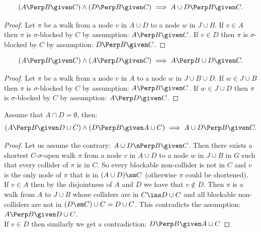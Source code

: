 \begin{Lem}
    \[ (A \Perp  B \given  C) \land (D \Perp  B \given C) \implies A \cup D \Perp  B \given C.\]
\begin{proof}
    Let $\pi$ be a walk from a node $v$ in $A \cup D$ to a node $w$ in $J \cup B$.
    If $v \in A$ then $\pi$ is $\sigma$-blocked by $C$ by assumption: $A \Perp  B \given  C$.
    If $v \in D$ then $\pi$ is $\sigma$-blocked by $C$ by assumption: $D \Perp  B \given  C$.
\end{proof}
\end{Lem}

\begin{Lem}
    \[ (A \Perp  B \given  C) \land (A \Perp  D \given C) \implies A \Perp  B \cup  D \given C.\]
\begin{proof}
    Let $\pi$ be a walk from a node $v$ in $A$ to a node $w$ in  $J \cup B \cup D$.
    If $w \in J \cup B$ then $\pi$ is $\sigma$-blocked by $C$ by assumption: $A \Perp  B \given  C$.
    If $w \in J \cup D$ then $\pi$ is $\sigma$-blocked by $C$ by assumption: $A \Perp  D \given  C$.
\end{proof}
\end{Lem}

\begin{Lem} Assume that $A \cap D = \emptyset$, then:
    \[ (A \Perp  B \given D \cup  C) \land (D \Perp  B \given A \cup C) \implies A \cup D \Perp  B \given   C.\]
\begin{proof}
    Let us assume the contrary:  $A \cup D \nPerp  B \given C$.
    Then there exists a shortest $C$-$\sigma$-open walk $\pi$ 
    from a node $v$ in $A \cup D$ to a node $w$ in $J \cup B $ in $G$ such that every collider of $\pi$ is in $C$.
    So every blockable non-collider is not in $C$ and $v$ is 
    the only node of $\pi$ that is in $(A \cup D)\sm C$ (otherwise $\pi$ could be shortened). \\
    If $v \in A$ then by the disjointness of $A$ and $D$ we have that $v \notin D$. 
    Then $\pi$ is a walk from $A$ to $J \cup B$ whose colliders are in $C \ins D \cup C$ 
    and all blockable non-colliders are not in $(D \sm C) \cup C =D \cup C$. This contradicts the assumption: $A \Perp  B \given D \cup  C$.\\
    If $v \in D$ then similarly we get a contradiction: $D \Perp  B \given A \cup  C$
\end{proof}
\end{Lem}

